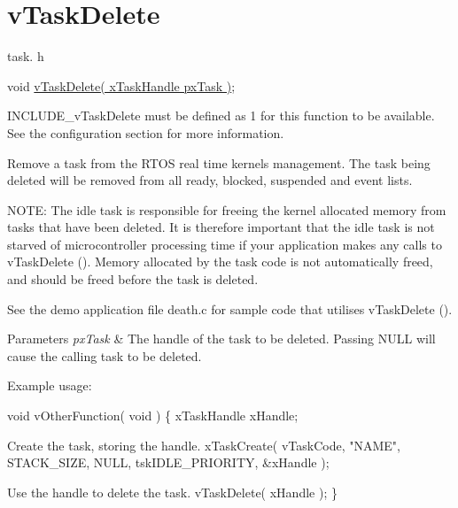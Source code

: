 \hypertarget{group__v_task_delete}{\section{v\-Task\-Delete}
\label{group__v_task_delete}
}
task. h 
\begin{DoxyPre}void \hyperlink{tasks_8c_a0cb4f94c57e14413220359afe4ae9620}{vTaskDelete( xTaskHandle pxTask )};\end{DoxyPre}


I\-N\-C\-L\-U\-D\-E\-\_\-v\-Task\-Delete must be defined as 1 for this function to be available. See the configuration section for more information.

Remove a task from the R\-T\-O\-S real time kernels management. The task being deleted will be removed from all ready, blocked, suspended and event lists.

N\-O\-T\-E\-: The idle task is responsible for freeing the kernel allocated memory from tasks that have been deleted. It is therefore important that the idle task is not starved of microcontroller processing time if your application makes any calls to v\-Task\-Delete (). Memory allocated by the task code is not automatically freed, and should be freed before the task is deleted.

See the demo application file death.\-c for sample code that utilises v\-Task\-Delete ().


\begin{DoxyParams}{Parameters}
{\em px\-Task} & The handle of the task to be deleted. Passing N\-U\-L\-L will cause the calling task to be deleted.\\
\hline
\end{DoxyParams}
Example usage\-: 
\begin{DoxyPre}
 void vOtherFunction( void )
 \{
 xTaskHandle xHandle;\end{DoxyPre}



\begin{DoxyPre}Create the task, storing the handle.
     xTaskCreate( vTaskCode, "NAME", STACK\_SIZE, NULL, tskIDLE\_PRIORITY, \&xHandle );\end{DoxyPre}



\begin{DoxyPre}Use the handle to delete the task.
     vTaskDelete( xHandle );
 \}
   \end{DoxyPre}
 